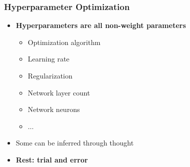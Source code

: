 \documentclass[aspectratio=1610]{beamer}
\begin{document}
\begin{frame}
\frametitle{Hyperparameter Optimization}

\begin{itemize}
    \item \textbf{Hyperparameters are all non-weight parameters}
    \begin{itemize}
        \item Optimization algorithm
        \item Learning rate
        \item Regularization
        \item Network layer count
        \item Network neurons
        \item $\dots$
    \end{itemize}
    \item Some can be inferred through thought
    \item \textbf{Rest: trial and error}
\end{itemize}
\end{frame}
\end{document}
